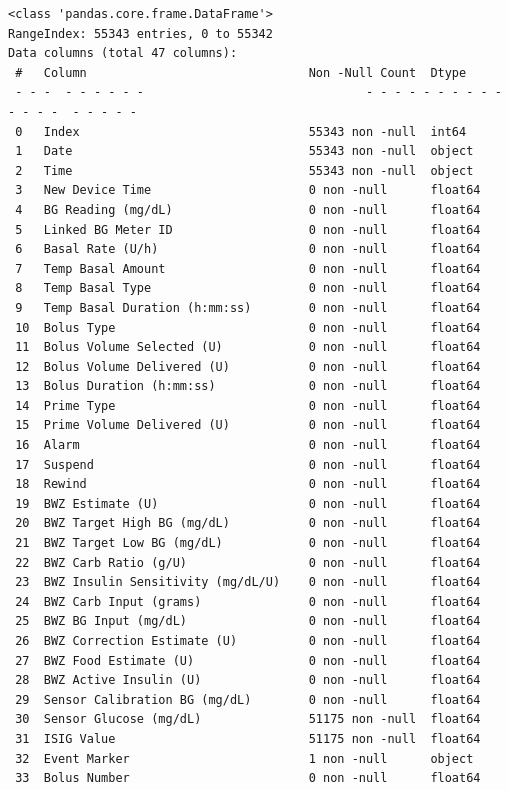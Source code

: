\begin{verbatim}
<class 'pandas.core.frame.DataFrame'>
RangeIndex: 55343 entries, 0 to 55342
Data columns (total 47 columns):
 #   Column                               Non -Null Count  Dtype  
 - - -  - - - - - -                               - - - - - - - - - - - - - -  - - - - -  
 0   Index                                55343 non -null  int64  
 1   Date                                 55343 non -null  object 
 2   Time                                 55343 non -null  object 
 3   New Device Time                      0 non -null      float64
 4   BG Reading (mg/dL)                   0 non -null      float64
 5   Linked BG Meter ID                   0 non -null      float64
 6   Basal Rate (U/h)                     0 non -null      float64
 7   Temp Basal Amount                    0 non -null      float64
 8   Temp Basal Type                      0 non -null      float64
 9   Temp Basal Duration (h:mm:ss)        0 non -null      float64
 10  Bolus Type                           0 non -null      float64
 11  Bolus Volume Selected (U)            0 non -null      float64
 12  Bolus Volume Delivered (U)           0 non -null      float64
 13  Bolus Duration (h:mm:ss)             0 non -null      float64
 14  Prime Type                           0 non -null      float64
 15  Prime Volume Delivered (U)           0 non -null      float64
 16  Alarm                                0 non -null      float64
 17  Suspend                              0 non -null      float64
 18  Rewind                               0 non -null      float64
 19  BWZ Estimate (U)                     0 non -null      float64
 20  BWZ Target High BG (mg/dL)           0 non -null      float64
 21  BWZ Target Low BG (mg/dL)            0 non -null      float64
 22  BWZ Carb Ratio (g/U)                 0 non -null      float64
 23  BWZ Insulin Sensitivity (mg/dL/U)    0 non -null      float64
 24  BWZ Carb Input (grams)               0 non -null      float64
 25  BWZ BG Input (mg/dL)                 0 non -null      float64
 26  BWZ Correction Estimate (U)          0 non -null      float64
 27  BWZ Food Estimate (U)                0 non -null      float64
 28  BWZ Active Insulin (U)               0 non -null      float64
 29  Sensor Calibration BG (mg/dL)        0 non -null      float64
 30  Sensor Glucose (mg/dL)               51175 non -null  float64
 31  ISIG Value                           51175 non -null  float64
 32  Event Marker                         1 non -null      object 
 33  Bolus Number                         0 non -null      float64

\end{verbatim}

